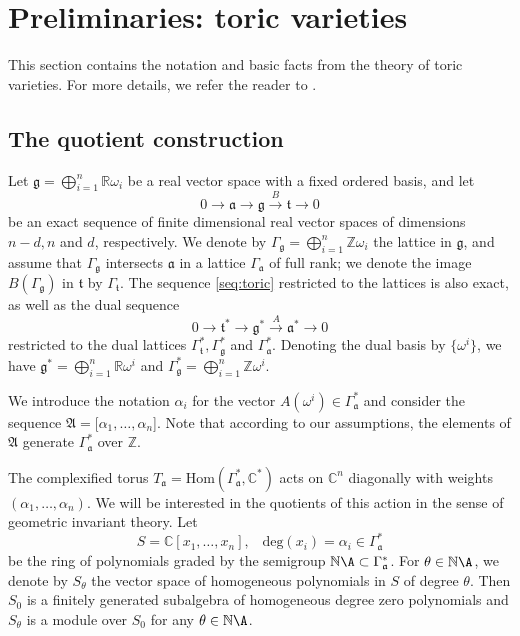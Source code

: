 \section{Preliminaries: toric varieties}\label{sec:toric}

This section contains the notation and basic facts from the theory of toric 
varieties. For more details, we refer the reader to \cite{Fulton, SzV}. 


\subsection{The quotient construction}\label{S2.1}

 Let $\mathfrak{g}=\bigoplus_{i=1}^n\mathbb{R}\omega_i$ be a real vector space with a fixed ordered basis, and let 
\begin{equation}\label{seq:toric}
0\to\mathfrak{a}\to \mathfrak{g}\xrightarrow{B} \mathfrak{t}\to 0
\end{equation}
be an exact sequence of finite dimensional real vector spaces of dimensions 
$n-d, n$ and $d$, respectively. We denote by $\Gamma_{\mathfrak{g}} = 
\bigoplus_{i=1}^n\mathbb{Z}\omega_i$ the lattice in $\mathfrak{g}$, and assume 
that $\Gamma_{\mathfrak{g}}$ intersects $\mathfrak{a}$ in a lattice 
$\Gamma_{\mathfrak{a}}$ of full rank; we denote the image 
$B(\Gamma_{\mathfrak{g}})$ in $\mathfrak{t}$ by $\Gamma_{\mathfrak{t}}$. The 
sequence \eqref{seq:toric} restricted to the lattices is also exact, as well as 
the dual sequence
\begin{equation*}\label{seq:toricdual}
0\to\mathfrak{t}^*\to \mathfrak{g}^*\xrightarrow{A} \mathfrak{a}^*\to 0
\end{equation*}
restricted to the dual lattices $\Gamma_{\mathfrak{t}}^*, \Gamma_{\mathfrak{g}}^* $ and $\Gamma_{\mathfrak{a}}^*$. 
Denoting the dual basis by $\{\omega^i\}$, we have $\mathfrak{g}^*=\bigoplus_{i=1}^n\mathbb{R}\omega^i$ and $\Gamma_{\mathfrak{g}}^* = \bigoplus_{i=1}^n\mathbb{Z}\omega^i$. 

We introduce the notation $\alpha_i$ for the vector $A(\omega^i)\in 
\Gamma_{\mathfrak{a}}^*$ and consider the  sequence $\mathfrak{A} = [\alpha_1,  \ldots , \alpha_n$]. Note that according to our assumptions, the elements of 
$\mathfrak{A}$ generate $\Gamma_{\mathfrak{a}}^*$ over $\mathbb{Z}$. 



The complexified torus $T_{\mathfrak{a}}=\mathrm{Hom}(\Gamma_\mathfrak{a}^*,\mathbb{C}^*)$ acts on $\mathbb{C}^n$ diagonally with weights $(\alpha_1, \ldots, \alpha_n)$. We will be interested in the quotients of this action in the sense of  geometric invariant theory. Let 
$$S = \mathbb{C}[x_1, \ldots, x_n], \,\,\,\,\,  \mathrm{deg}(x_i) = 
\alpha_i\in\Gamma_{\mathfrak{a}}^*$$ be the ring of polynomials graded by the 
semigroup $\mathbb{N}\A\subset\Gamma_{\mathfrak{a}}^*$. For $\theta \in 
\mathbb{N}\A$, we denote by $S_\theta$ the vector space of homogeneous 
polynomials in $ S $ of degree $\theta$. Then $S_0$ is a finitely generated 
subalgebra of homogeneous degree zero polynomials  and  $S_\theta$ is a module 
over $S_0$ for any $\theta\in\mathbb{N}\A$. 

